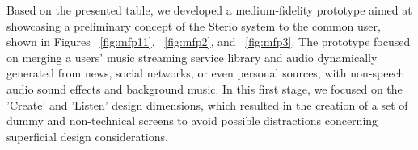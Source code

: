 {{Based on the presented table, we developed a medium-fidelity prototype aimed at showcasing a preliminary concept of the Sterio system to the common user, shown in Figures ~\ref{fig:mfp11}, ~\ref{fig:mfp2}, and ~\ref{fig:mfp3}. The prototype focused on merging a users' music streaming service library and audio dynamically generated from news, social networks, or even personal sources, with non-speech audio sound effects and background music. In this first stage, we focused on the 'Create' and 'Listen' design dimensions, which resulted in the creation of a set of dummy and non-technical screens to avoid possible distractions concerning superficial design considerations.

\begin{figure}[htbp]
	\centering
	 \qquad
	 \qquad

\end{figure}}}
